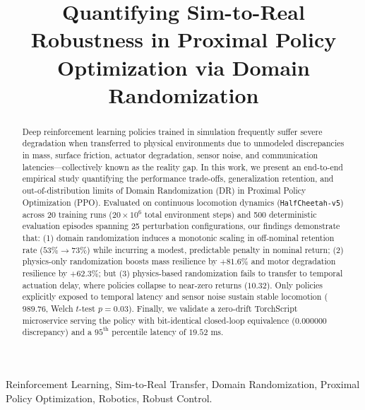 \documentclass[conference]{IEEEtran}
\begin{document}
\title{Quantifying Sim-to-Real Robustness in Proximal Policy Optimization via Domain Randomization}

\author{
}

\maketitle

\begin{abstract}
Deep reinforcement learning policies trained in simulation frequently suffer severe degradation when transferred to physical environments due to unmodeled discrepancies in mass, surface friction, actuator degradation, sensor noise, and communication latencies---collectively known as the reality gap. In this work, we present an end-to-end empirical study quantifying the performance trade-offs, generalization retention, and out-of-distribution limits of Domain Randomization (DR) in Proximal Policy Optimization (PPO). Evaluated on continuous locomotion dynamics (\texttt{HalfCheetah-v5}) across 20 training runs ($20 \times 10^6$ total environment steps) and 500 deterministic evaluation episodes spanning 25 perturbation configurations, our findings demonstrate that: (1) domain randomization induces a monotonic scaling in off-nominal retention rate ($53\% \rightarrow 73\%$) while incurring a modest, predictable penalty in nominal return; (2) physics-only randomization boosts mass resilience by $+81.6\%$ and motor degradation resilience by $+62.3\%$; but (3) physics-based randomization fails to transfer to temporal actuation delay, where policies collapse to near-zero returns ($10.32$). Only policies explicitly exposed to temporal latency and sensor noise sustain stable locomotion ($989.76$, Welch $t$-test $p = 0.03$). Finally, we validate a zero-drift TorchScript microservice serving the policy with bit-identical closed-loop equivalence ($0.000000$ discrepancy) and a $95^{\text{th}}$ percentile latency of $19.52\text{ ms}$.
\end{abstract}

\begin{IEEEkeywords}
Reinforcement Learning, Sim-to-Real Transfer, Domain Randomization, Proximal Policy Optimization, Robotics, Robust Control.
\end{IEEEkeywords}
\end{document}
